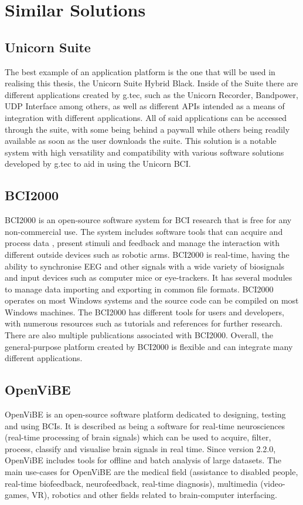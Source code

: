 \section{Similar Solutions}\label{sect:similar solutions}

\subsection{Unicorn Suite}
The best example of an application platform is the one that will be used in realising this thesis, the Unicorn Suite Hybrid Black. Inside of the Suite there are different applications created by g.tec, such as the Unicorn Recorder, Bandpower, UDP Interface among others, as well as different APIs intended as a means of integration with different applications. All of said applications can be accessed through the suite, with some being behind a paywall while others being readily available as soon as the user downloads the suite\cite{Unicorn_Suite}. This solution is a notable system with high versatility and compatibility with various software solutions developed by g.tec to aid in using the Unicorn BCI.

\subsection{BCI2000}
BCI2000 is an open-source software system for BCI research that is free for any non-commercial use. The system includes software tools that can acquire and process data , present stimuli and feedback and manage the interaction with different outside devices such as robotic arms. BCI2000 is real-time, having the ability to synchronise EEG and other signals with a wide variety of biosignals and input devices such as computer mice or eye-trackers. It has several modules to manage data importing and exporting in common file formats. BCI2000 operates on most Windows systems and the source code can be compiled on most Windows machines\cite{BCI2000}. The BCI2000 has different tools for users and developers, with numerous resources such as tutorials and references for further research. There are also multiple publications associated with BCI2000. Overall, the general-purpose platform created by BCI2000 is flexible and can integrate many different applications.

\subsection{OpenViBE}
OpenViBE is an open-source software platform dedicated to designing, testing and using BCIs. It is described as being a software for real-time neurosciences (real-time processing of brain signals) which can be used to acquire, filter, process, classify and visualise brain signals in real time. Since version 2.2.0, OpenViBE includes tools for offline and batch analysis of large datasets. The main use-cases for OpenViBE are the medical field (assistance to disabled people, real-time biofeedback, neurofeedback, real-time diagnosis), multimedia (video-games, VR), robotics and other fields related to brain-computer interfacing.


